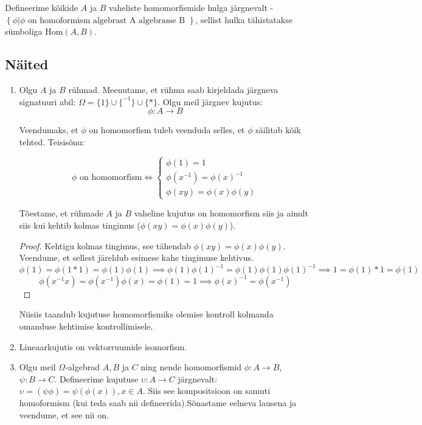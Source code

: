 \documentclass[12pt]{report}
\numberwithin{equation}{section}
\theoremstyle{definition}
\theoremstyle{plain}
\begin{document}
Defineerime kõikide $A$ ja $B$ vaheliste homomorfismide hulga järgnevalt - $\left\{ \phi | \phi \text{ on homoformism algebrast A algebrasse B }  \right\} $, sellist hulka tähistatakse s\"umboliga Hom$(A,B)$.

\subsection*{Näited}
\begin{enumerate}[I]
\item{
Olgu $A$ ja $B$ r\"uhmad. Meenutame, et r\"uhma saab kirjeldada järgneva signatuuri abil: $\Omega = \{1\} \cup \{ ^{-1} \} \cup \{*\}$. Olgu meil järgnev kujutus:
\begin{equation*}
\phi : A \rightarrow B 
\end{equation*}

Veendumaks, et $\phi$ on homomorfism tuleb veenduda selles, et $\phi$ säilitab kõik tehted. Teisisõnu:

\begin{equation*}
\phi \text{ on homomorfism} \iff 
\begin{cases}
\phi(1) = 1 \\
\phi(x^{-1}) = \phi(x)^{-1} \\
\phi(xy) = \phi(x)\phi(y)
\end{cases} 
\end{equation*}

Tõestame, et r\"uhmade $A$ ja $B$ vaheline kujutus on homomorfism siis ja ainult siis kui kehtib kolmas tingimus ($\phi(xy)= \phi(x) \phi(y)$). 
\begin{proof}
Kehtigu kolmas tingimus, see tähendab $\phi(xy)= \phi(x) \phi(y)$. Veendume, et sellest järeldub esimese kahe tingimuse kehtivus.
\begin{equation*}
\phi(1) = \phi(1*1) = \phi(1)\phi(1) \implies \phi(1)\phi(1)^{-1} = \phi(1)\phi(1)\phi(1)^{-1} \implies 1 = \phi(1)*1 = \phi(1)
\end{equation*}
\begin{equation*}
 \phi(x^{-1}x) = \phi(x^{-1})\phi(x) = \phi(1) = 1 \implies \phi(x)^{-1} = \phi(x^{-1})
\end{equation*}
\end{proof}

Niisiis taandub kujutuse homomorfismiks olemise kontroll kolmanda omanduse kehtimise kontrollimisele.}

\item Lineaarkujutis on vektorruumide isomorfism.

\item{ Olgu meil $\Omega$-algebrad $A,B$ ja $C$ ning nende homomorfismid $\phi : A \to B$, $\psi : B \to C$. Defineerime kujutuse $\upsilon: A \to C$ järgnevalt: $\upsilon =  (\psi \phi ) = \psi (\phi ( x)), x \in A$.  Siis see kompositsioon on samuti homoformism (kui teda saab nii defineerida).Sõnastame eelneva lausena ja veendume, et see nii on. 
}

\end{enumerate}
\end{document}
